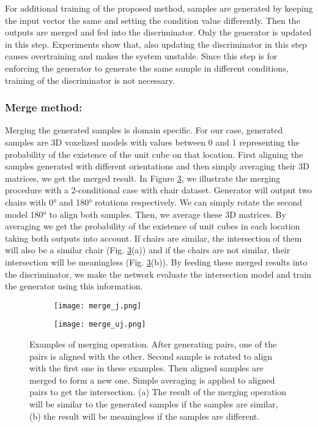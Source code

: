 \documentclass[runningheads]{llncs}
\begin{document}
For additional training of the proposed method, samples are generated by keeping the input vector the same and setting the condition value differently. Then the outputs are merged and fed into the discriminator. Only the generator is updated in this step. Experiments show that, also updating the discriminator in this step causes overtraining and makes the system unstable. Since this step is for enforcing the 
generator to generate the same sample in different conditions, training of the discriminator is not necessary.

\subsubsection{Merge method:} Merging the generated samples is domain specific. For our case, generated samples are 3D voxelized models with values between 0 and 1 representing the probability of the existence of the unit cube on that location. First aligning the samples generated with different orientations and then simply averaging their 3D matrices, we get the merged result. In Figure \ref{fig:fig4}, we illustrate the merging procedure with a 2-conditional case with chair dataset. Generator will output two chairs with \ang{0} and \ang{180} rotations respectively. We can simply rotate the second model \ang{180} to align both samples. Then, we average these 3D matrices. By averaging we get the probability of the existence of unit cubes in each location taking both outputs into account. If chairs are similar, the intersection of them will also be a similar chair (Fig. \ref{fig:fig4}(a)) and if the chairs are not similar, their intersection will be meaningless (Fig. \ref{fig:fig4}(b)). By feeding these merged results into the discriminator, we make the network evaluate the intersection model and train the generator using this information.

\begin{figure}
\centering
\begin{subfigure}{.4\textwidth}
  \centering
  \texttt{[image: merge\_j.png]}
  \caption{}
 \label{fig:sfig4a}
\end{subfigure}%
\qquad
\begin{subfigure}{.4\textwidth}
  \centering
  \texttt{[image: merge\_uj.png]}
  \caption{}
  \label{fig:sfig4b}
\end{subfigure}
\caption{Examples of merging operation. After generating pairs, one of the pairs is aligned with the other. Second sample is rotated to align with the first one in these examples. Then aligned samples are merged to form a new one. Simple averaging is applied to aligned pairs to get the intersection. (a) The result of the merging operation will be similar to the generated samples if the samples are similar, (b) the result will be meaningless if the samples are different.}
\label{fig:fig4}
\end{figure}
\end{document}
